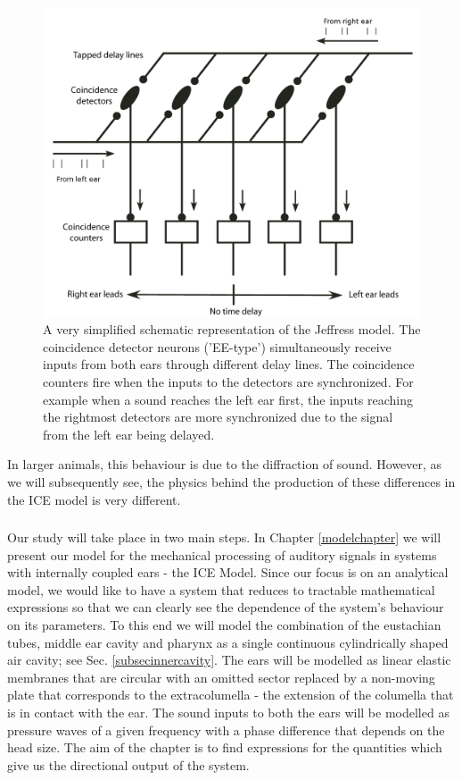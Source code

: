\begin{figure}[ht!]
 \centering
 \includegraphics[width=0.6\linewidth]{Diagrams/Jeffress.png}
 \caption[Delay line coincidence detector - Jeffress model]{A very simplified schematic representation of the Jeffress model. The coincidence detector neurons ('EE-type')
 simultaneously receive inputs from both ears through different delay lines. The coincidence counters fire when the inputs to the detectors are synchronized. For
 example when a sound reaches the left ear first, the inputs reaching the rightmost detectors are more synchronized due to the signal from the left ear being
 delayed.}
 \label{jeffressmodel}
\end{figure}

In larger animals, this behaviour is
due to the diffraction of sound. However, as we will
subsequently see, the physics behind the production of these differences in the ICE model is very different.
\subsubsection*{}
Our study will take place in two main steps. In Chapter \ref{modelchapter} we will
present our model for the mechanical processing of auditory signals in systems with internally coupled ears - the ICE Model.
Since our focus is on an analytical model, we would like to have a system that reduces to tractable mathematical expressions
so that we can clearly see the dependence of the system's behaviour on its parameters. To this end we will model the 
combination of the eustachian tubes, middle ear cavity and pharynx as a single continuous cylindrically shaped air cavity; see
Sec. \ref{subsecinnercavity}. The ears will be modelled as linear elastic membranes that are circular with an omitted sector replaced
by a non-moving plate
that corresponds to the extracolumella - the extension of the columella that is in contact with the ear. The
sound inputs to both the ears will be modelled as pressure waves of a given frequency with a phase difference that depends on the 
head size. The aim of the chapter is to find expressions for the quantities which give us the directional output of the system.

